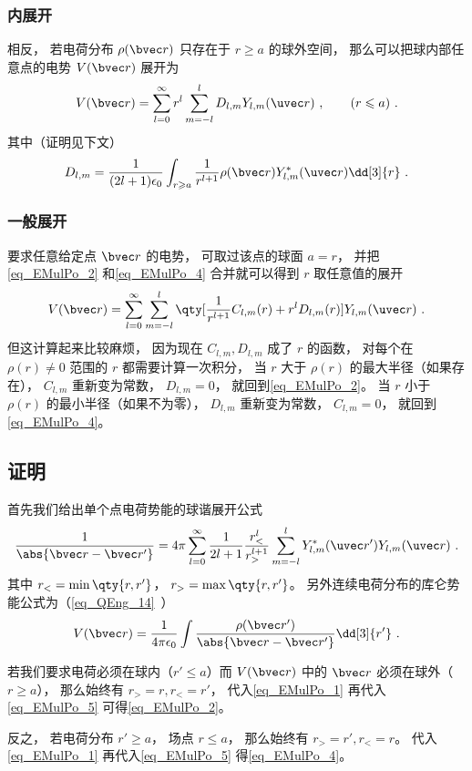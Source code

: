 \subsubsection{内展开}
相反， 若电荷分布 $\rho(\bvec r)$ 只存在于 $r \geqslant a$ 的球外空间， 那么可以把球内部任意点的电势 $V(\bvec r)$ 展开为
\begin{equation}\label{eq_EMulPo_4}
V(\bvec r) = \sum_{l = 0}^\infty r^l \sum_{m = -l}^l D_{l,m} Y_{l,m}(\uvec r)~, \qquad (r \leqslant a)~.
\end{equation}
其中（证明见下文）
\begin{equation}\label{eq_EMulPo_3}
D_{l,m} = \frac{1}{(2l+1)\epsilon_0} \int_{r\geqslant a} \frac{1}{r^{l+1}} \rho(\bvec r) Y_{l,m}^*(\uvec r) \dd[3]{r}~.
\end{equation}

\subsubsection{一般展开}
要求任意给定点 $\bvec r$ 的电势， 可取过该点的球面 $a = r$， 并把\autoref{eq_EMulPo_2} 和\autoref{eq_EMulPo_4} 合并就可以得到 $r$ 取任意值的展开
\begin{equation}
V(\bvec r) = \sum_{l = 0}^\infty\sum_{m = -l}^l \qty[\frac{1}{r^{l+1}} C_{l,m}(r) + r^l D_{l,m}(r)] Y_{l,m}(\uvec r)~.
\end{equation}
但这计算起来比较麻烦， 因为现在 $C_{l,m}, D_{l,m}$ 成了 $r$ 的函数， 对每个在 $\rho(r)\ne 0$ 范围的 $r$ 都需要计算一次积分， 当 $r$ 大于 $\rho(r)$ 的最大半径（如果存在）， $C_{l,m}$ 重新变为常数， $D_{l,m}= 0$， 就回到\autoref{eq_EMulPo_2}。 当 $r$ 小于 $\rho(r)$ 的最小半径（如果不为零）， $D_{l,m}$ 重新变为常数， $C_{l,m} = 0$， 就回到\autoref{eq_EMulPo_4}。

\subsection{证明}
首先我们给出单个点电荷势能的球谐展开公式
\begin{equation}\label{eq_EMulPo_1}
\frac{1}{\abs{\bvec r - \bvec r'}} = 4\pi \sum_{l=0}^{\infty} \frac{1}{2l+1} \frac{r_<^l}{r_>^{l+1}} \sum_{m = -l}^l Y_{l,m}^*(\uvec r') Y_{l,m}(\uvec r)~.
\end{equation}
其中 $r_< = \min\qty{r, r'}$， $r_> = \max\qty{r, r'}$。 另外连续电荷分布的库仑势能公式为（\autoref{eq_QEng_14}~）
\begin{equation}\label{eq_EMulPo_5}
V(\bvec r) = \frac{1}{4\pi\epsilon_0}\int \frac{\rho(\bvec r')}{\abs{\bvec r - \bvec r'}} \dd[3]{r'}~.
\end{equation}

若我们要求电荷必须在球内（$r' \leqslant a$）而 $V(\bvec r)$ 中的 $\bvec r$ 必须在球外（$r \geqslant a$）， 那么始终有 $r_> = r, r_< = r'$， 代入\autoref{eq_EMulPo_1} 再代入\autoref{eq_EMulPo_5} 可得\autoref{eq_EMulPo_2}。

反之， 若电荷分布 $r' \geqslant a$， 场点 $r \leqslant a$， 那么始终有 $r_> = r', r_< = r$。 代入\autoref{eq_EMulPo_1} 再代入\autoref{eq_EMulPo_5} 得\autoref{eq_EMulPo_4}。
